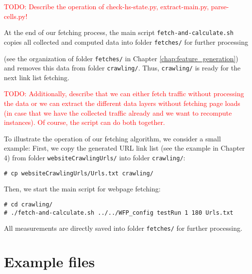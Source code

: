 \textcolor{red}{TODO: Describe the operation of check-hs-state.py, extract-main.py, parse-cells.py!}

At the end of our fetching process, the main script \texttt{fetch-and-calculate.sh} copies all collected and computed data into folder \texttt{fetches/} for further processing 


(see the organization of folder \texttt{fetches/} in Chapter \ref{chap:feature_generation}) and removes this data from folder \texttt{crawling/}. Thus, \texttt{crawling/} is ready for the next link list fetching.


\textcolor{red}{TODO: Additionally, describe that we can either fetch traffic without processing the data or we can extract the different data layers without fetching page loads (in case that we have the collected traffic already and we want to recompute instances). Of course, the script can do both together.}

To illustrate the operation of our fetching algorithm, we consider a small example: First, we copy the generated \ac{URL} link list (see the example in Chapter 4) from folder \texttt{websiteCrawlingUrls/} into folder \texttt{crawling/}:
\vspace{-5mm}
\begin{verbatim}
# cp websiteCrawlingUrls/Urls.txt crawling/
\end{verbatim}
\vspace{-4mm}
Then, we start the main script for webpage fetching:
\vspace{-4mm}
\begin{verbatim}
# cd crawling/
# ./fetch-and-calculate.sh ../../WFP_config testRun 1 180 Urls.txt 
\end{verbatim}
\vspace{-4mm}
All measurements are directly saved into folder \texttt{fetches/} for further processing.

\section{Example files}
%

